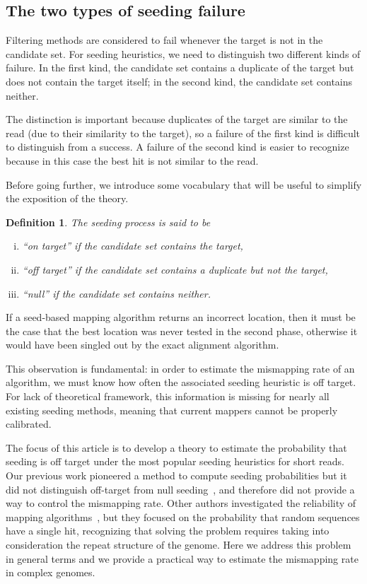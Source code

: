 \documentclass{article}
\newtheorem{definition}{Definition}
\begin{document}
\subsection{The two types of seeding failure}
\label{sec:twotypes}

Filtering methods are considered to fail whenever the target is not in the
candidate set. For seeding heuristics, we need to distinguish two
different kinds of failure. In the first kind, the candidate set contains 
a duplicate of the target but does not contain the target itself; in the
second kind, the candidate set contains neither.

The distinction is important because duplicates of the target are similar
to the read (due to their similarity to the target), so a failure of the
first kind is difficult to distinguish from a success. A failure of the
second kind is easier to recognize because in this case the best hit is
not similar to the read.

Before going further, we introduce some vocabulary that will be useful to
simplify the exposition of the theory.

\begin{definition}
The seeding process is said to be
\begin{enumerate}[i)]
\item ``on target'' if the candidate set contains the target,
\item ``off target'' if the candidate set contains a duplicate but
not the target, 
\item ``null'' if the candidate set contains neither.
\end{enumerate}
\end{definition}

If a seed-based mapping algorithm returns an incorrect location, then it
must be the case that the best location was never tested in the second
phase, otherwise it would have been singled out by the exact alignment
algorithm.

This observation is fundamental: in order to estimate the mismapping rate
of an algorithm, we must know how often the associated seeding heuristic
is off target. For lack of theoretical framework, this information is
missing for nearly all existing seeding methods, meaning that current
mappers cannot be properly calibrated.

The focus of this article is to develop a theory to estimate the
probability that seeding is off target under the most popular seeding
heuristics for short reads. Our previous work pioneered a method to
compute seeding probabilities but it did not distinguish off-target from
null seeding~\cite{filion2017analytic,filion2018analytic}, and therefore
did not provide a way to control the mismapping rate. Other authors
investigated the reliability of mapping algorithms~\cite{pmid23872968},
but they focused on the probability that random sequences have a single
hit, recognizing that solving the problem requires taking into
consideration the repeat structure of the genome. Here we address this
problem in general terms and we provide a practical way to estimate the
mismapping rate in complex genomes.
\end{document}
